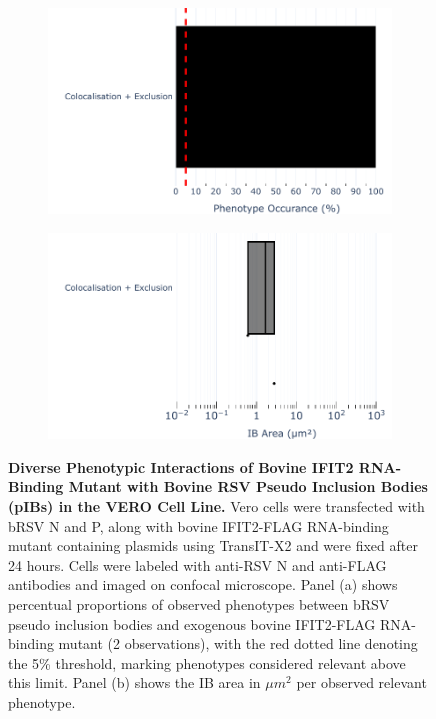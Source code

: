 \begin{figure}
    \begin{subfigure}{0.495\textwidth}
        \caption{}
        \includegraphics[width=1\linewidth]{08. Chapter 3/Figs/03. pIB/03. IFIT2/05. IFIT2-RNA binding mutant/02. pIB/04. bar_bi2f24_bnbp.pdf} 
    \end{subfigure}
    \begin{subfigure}{0.495\textwidth}
        \caption{}
        \includegraphics[width=1\linewidth]{08. Chapter 3/Figs/03. pIB/03. IFIT2/05. IFIT2-RNA binding mutant/02. pIB/05. box_bi2f24_bnbp.pdf}
    \end{subfigure}
    \caption[Diverse Phenotypic Interactions of Bovine IFIT2 RNA-Binding Mutant with Bovine RSV Pseudo Inclusion Bodies (pIBs) in the VERO Cell Line.]{\textbf{Diverse Phenotypic Interactions of Bovine IFIT2 RNA-Binding Mutant with Bovine RSV Pseudo Inclusion Bodies (pIBs) in the VERO Cell Line.} Vero cells were transfected with bRSV N and P, along with bovine IFIT2-FLAG RNA-binding mutant containing plasmids using TransIT-X2 and were fixed after 24 hours. Cells were labeled with anti-RSV N and anti-FLAG antibodies and imaged on confocal microscope. Panel (a) shows percentual proportions of observed phenotypes between bRSV pseudo inclusion bodies and exogenous bovine IFIT2-FLAG RNA-binding mutant (2 observations), with the red dotted line denoting the 5\% threshold, marking phenotypes considered relevant above this limit. Panel (b) shows the IB area in \(\mu m^2\) per observed relevant phenotype.}
    \label{fig:Diverse Phenotypic Interactions of Bovine IFIT2 RNA-Binding Mutant with Bovine RSV Pseudo Inclusion Bodies (pIBs) in the VERO Cell Line}
\end{figure}


